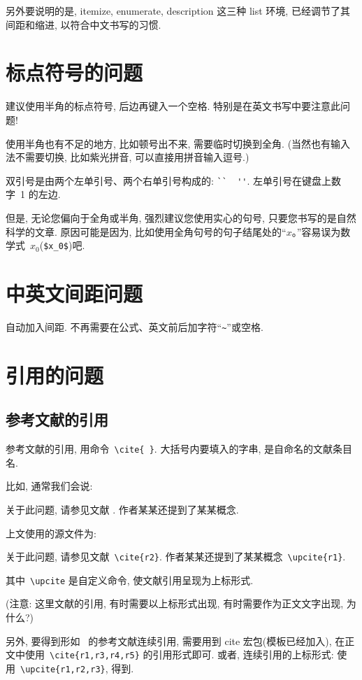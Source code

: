 \documentclass{WHUMaster}   %
\begin{document}
另外要说明的是,  itemize, enumerate, description 这三种 list 环境, 已经调节了其间距和缩进,
以符合中文书写的习惯.

\section{标点符号的问题}

建议使用半角的标点符号, 后边再键入一个空格. 特别是在英文书写中要注意此问题!

使用半角也有不足的地方, 比如顿号出不来, 需要临时切换到全角. (当然也有输入法不需要切换, 比如紫光拼音, 可以直接用拼音输入逗号.)

双引号是由两个左单引号、两个右单引号构成的: \verb|``  ''|. 左单引号在键盘上数字~1 的左边.

但是, 无论您偏向于全角或半角, 强烈建议您使用实心的句号, 只要您书写的是自然科学的文章.
原因可能是因为, 比如使用全角句号的句子结尾处的``$x$。''容易误为数学式~$x_0$(\verb|$x_0$|)吧.

\section{中英文间距问题}

自动加入间距. 不再需要在公式、英文前后加字符``\verb|~|''或空格.

\section{引用的问题}


\subsection{参考文献的引用}

参考文献的引用, 用命令~\verb|\cite{ }|. 大括号内要填入的字串, 是自命名的文献条目名.

比如, 通常我们会说:

 {\kaishu
关于此问题, 请参见文献 \cite{r2}. 作者某某还提到了某某概念.}


上文使用的源文件为:

 {\kaishu
关于此问题, 请参见文献~\verb|\cite{r2}|. 作者某某还提到了某某概念~\verb|\upcite{r1}|.
}

其中~\verb|\upcite| 是自定义命令, 使文献引用呈现为上标形式.

({\heiti 注意:} {\kaishu 这里文献的引用, 有时需要以上标形式出现, 有时需要作为正文文字出现, 为什么?})

另外, 要得到形如~\cite{r1,r3,r4,r5} 的参考文献连续引用, 需要用到 cite 宏包(模板已经加入),
在正文中使用~\verb|\cite{r1,r3,r4,r5}| 的引用形式即可.
或者, 连续引用的上标形式: 使用~\verb|\upcite{r1,r2,r3}|, 得到.
\end{document}
